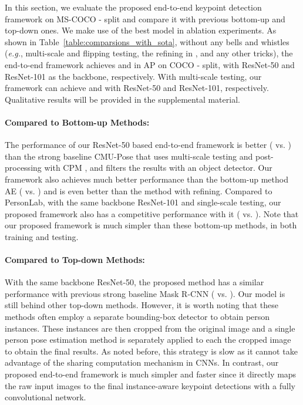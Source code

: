 \documentclass[10pt,twocolumn,letterpaper]{article}
\renewcommand{\texttt}[1]{}
\def\eg{{\it e.g.}\xspace}
\newcommand{\1}{{\mathbbm{1}}}
\begin{document}
{\begin{table}
	\caption{The performance of our proposed end-to-end framework on COCO \texttt{test}-\texttt{dev} split.  and  respectively denote using refining and multi-scale testing. As shown in the table, the new end-to-end framework achieves competitive or better performance than previous strong baselines (\eg, Mask R-CNN and CMU-Pose).}
	\label{table:comparsions_with_sota}
\end{table}
In this section, we evaluate the proposed end-to-end keypoint detection framework on MS-COCO \texttt{test}-\texttt{dev} split and compare it with previous bottom-up and top-down ones. We make use of the best model in ablation experiments. As shown in Table~\ref{table:comparsions_with_sota}, without any bells and whistles (\eg, multi-scale and flipping testing, the refining in \cite{cao2017realtime, newell2017associative}, and any other tricks), the end-to-end framework achieves  and  in AP on COCO \texttt{test}-\texttt{dev} split, with ResNet-50 and ResNet-101 as the backbone, respectively. With multi-scale testing, our framework can achieve  and  with ResNet-50 and ResNet-101, respectively. Qualitative results will be provided in the supplemental material.

\paragraph{Compared to Bottom-up Methods:} The performance of our ResNet-50 based end-to-end framework is better ( vs. ) than the strong baseline CMU-Pose \cite{cao2017realtime} that uses multi-scale testing and post-processing with CPM \cite{wei2016convolutional}, and filters the results with an object detector. Our framework also achieves much better performance than the bottom-up method AE \cite{newell2017associative} ( vs. ) and is even better than the method with refining. Compared to PersonLab, with the same backbone ResNet-101 and single-scale testing, our proposed framework also has a competitive performance with it ( vs. ). Note that our proposed framework is much simpler than these bottom-up methods, in both training and testing.

\paragraph{Compared to Top-down Methods:} With the same backbone ResNet-50, the proposed method has a similar performance with previous strong baseline Mask R-CNN ( vs. ). Our model is still behind other top-down methods. However, it is worth noting that these methods often employ a separate bounding-box detector to obtain person instances. These instances are then cropped from the original image and a single person pose estimation method is separately applied to each the cropped image to obtain the final results. As noted before, this strategy is slow as it cannot take advantage of the sharing computation mechanism in CNNs. In contrast, our proposed end-to-end framework is much simpler and faster since it directly maps the raw input images to the final instance-aware keypoint detections with a fully convolutional network.
}
\end{document}

